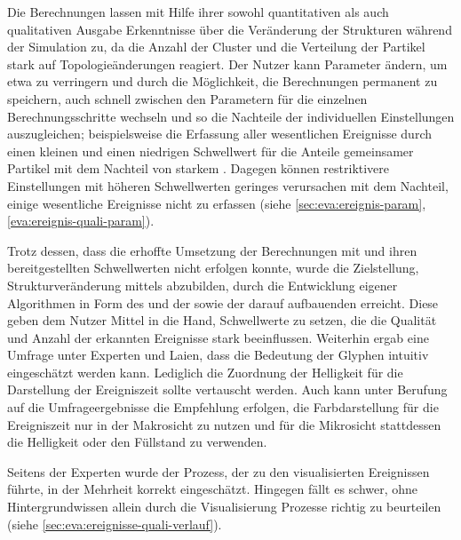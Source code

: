 Die Berechnungen lassen mit Hilfe ihrer sowohl quantitativen als auch qualitativen Ausgabe Erkenntnisse über die Veränderung der Strukturen während der Simulation zu, da die Anzahl der Cluster und die Verteilung der Partikel stark auf Topologieänderungen reagiert. Der Nutzer kann Parameter ändern, um etwa  zu verringern und durch die Möglichkeit, die Berechnungen permanent zu speichern, auch schnell zwischen den Parametern für die einzelnen Berechnungsschritte wechseln und so die Nachteile der individuellen Einstellungen auszugleichen; beispielsweise die Erfassung aller wesentlichen Ereignisse durch einen kleinen  und einen niedrigen Schwellwert für die Anteile gemeinsamer Partikel mit dem Nachteil von starkem . Dagegen können restriktivere Einstellungen mit höheren Schwellwerten geringes  verursachen mit dem Nachteil, einige wesentliche Ereignisse nicht zu erfassen (siehe \autoref{sec:eva:ereignis-param}, \autoref{eva:ereignis-quali-param}).

Trotz dessen, dass die erhoffte Umsetzung der Berechnungen mit  und ihren bereitgestellten Schwellwerten nicht erfolgen konnte, wurde die Zielstellung, Strukturveränderung mittels  abzubilden, durch die Entwicklung eigener Algorithmen in Form des \CFD und der \SECC sowie der darauf aufbauenden  erreicht. Diese geben dem Nutzer Mittel in die Hand, Schwellwerte zu setzen, die die Qualität und Anzahl der erkannten Ereignisse stark beeinflussen. Weiterhin ergab eine Umfrage unter Experten und Laien, dass die Bedeutung der Glyphen intuitiv eingeschätzt werden kann. Lediglich die Zuordnung der Helligkeit für die Darstellung der Ereigniszeit sollte vertauscht werden. Auch kann unter Berufung auf die Umfrageergebnisse die Empfehlung erfolgen, die Farbdarstellung für die Ereigniszeit nur in der Makrosicht zu nutzen und für die Mikrosicht stattdessen die Helligkeit oder den Füllstand zu verwenden.

Seitens der Experten wurde der Prozess, der zu den visualisierten Ereignissen führte, in der Mehrheit korrekt eingeschätzt. Hingegen fällt es schwer, ohne Hintergrundwissen allein durch die Visualisierung Prozesse richtig zu beurteilen (siehe \autoref{sec:eva:ereignisse-quali-verlauf}).

